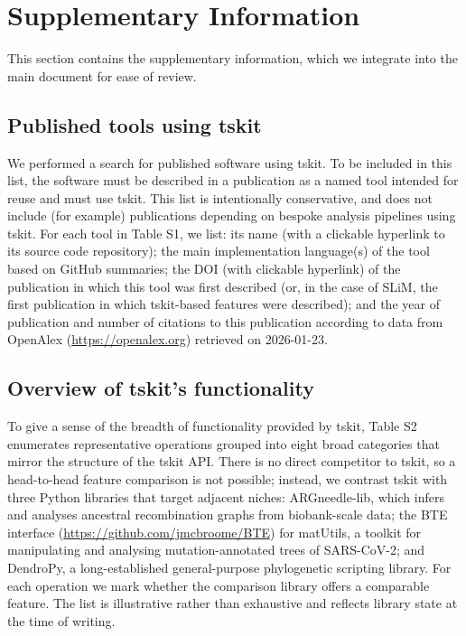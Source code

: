 \documentclass{article}
\begin{document}
\newpage

\section*{Supplementary Information}
\appendix
\setcounter{table}{0}
\setcounter{figure}{0}
\renewcommand{\thetable}{S\arabic{table}}
\renewcommand{\thefigure}{S\arabic{figure}}
\renewcommand{\thesubsection}{\arabic{subsection}}

This section contains the supplementary information, which we integrate
into the main document for ease of review.

\subsection*{Published tools using tskit}
We performed a search for published software using tskit.
To be included in this list, the software must be described in a publication
as a named tool intended for reuse and must use tskit.
This list is intentionally conservative, and does not include
(for example) publications depending on bespoke analysis
pipelines using tskit.
For each tool in Table S1, we list: its name (with a clickable
hyperlink to its source code repository);
the main implementation
language(s) of the tool based on GitHub summaries;
the DOI (with clickable hyperlink) of the publication in which this
tool was first described (or, in the case of SLiM, the first
publication in which tskit-based features were described);
and the year of publication and number of citations to this
publication according to data from OpenAlex
(\url{https://openalex.org}) retrieved on 2026-01-23.



\subsection*{Overview of tskit's functionality}
To give a sense of the breadth of functionality provided by tskit,
Table S2 enumerates representative operations grouped into eight
broad categories that mirror the structure of the tskit API.
There is no direct competitor to tskit, so a head-to-head feature
comparison is not possible; instead, we contrast tskit with three
Python libraries that target adjacent niches:
ARGneedle-lib, which infers and analyses
ancestral recombination graphs from biobank-scale data;
the BTE interface (\url{https://github.com/jmcbroome/BTE})
for matUtils,
a toolkit for manipulating and analysing mutation-annotated trees of SARS-CoV-2;
and DendroPy, a long-established
general-purpose phylogenetic scripting library.
For each operation we mark whether the comparison library offers a
comparable feature.
The list is illustrative rather than exhaustive and reflects
library state at the time of writing.



\end{document}

